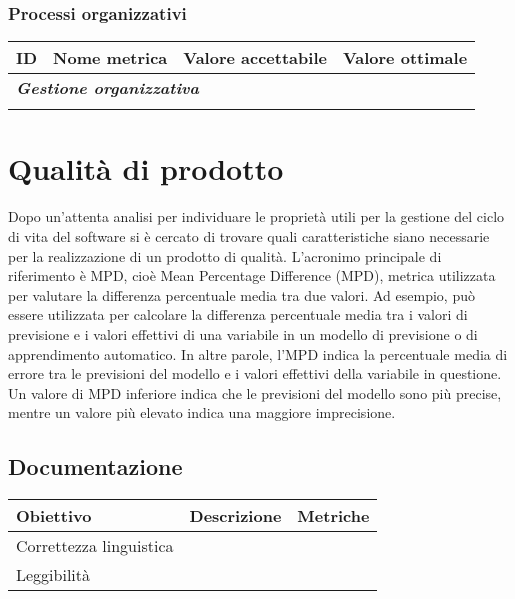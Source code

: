 \documentclass[10pt, a4paper]{article}
\begin{document}
\subsubsection{Processi organizzativi}
    {\renewcommand{\arraystretch}{1.5}
    \begin{tabularx}{\textwidth}{p{}|p{}|X|X}
    \textbf{ID} & \textbf{Nome metrica} & \textbf{Valore accettabile} & \textbf{Valore ottimale}  \\
    \hline
    \multicolumn{4}{l}{\cellcolor{primarycolor}\textbf{\textit{Gestione organizzativa}}} \\
    \hline
     &  &  &  \\
    \end{tabularx}}  

\newpage
\section{Qualità di prodotto}
Dopo un'attenta analisi per individuare le proprietà utili per la gestione del ciclo di vita del software 
si è cercato di trovare quali caratteristiche siano necessarie per la realizzazione di un prodotto di 
qualità.
L’acronimo principale di riferimento è MPD, cioè Mean Percentage Difference (MPD), metrica 
utilizzata per valutare la differenza percentuale media tra due valori. Ad esempio, può essere 
utilizzata per calcolare la differenza percentuale media tra i valori di previsione e i valori effettivi di 
una variabile in un modello di previsione o di apprendimento automatico.
In altre parole, l'MPD indica la percentuale media di errore tra le previsioni del modello e i valori 
effettivi della variabile in questione. Un valore di MPD inferiore indica che le previsioni del modello 
sono più precise, mentre un valore più elevato indica una maggiore imprecisione.
\subsection{Documentazione}
    {\renewcommand{\arraystretch}{1.5}
    \begin{tabularx}{\textwidth}{p{}|p{}|X}
    \textbf{Obiettivo} & \textbf{Descrizione} & \textbf{Metriche}  \\
    \hline
    Correttezza linguistica &  & \\
    \hline
    Leggibilità &  &  \\
    \end{tabularx}}
    
\end{document}
